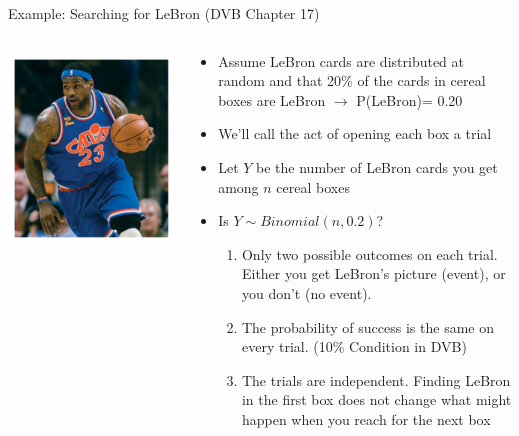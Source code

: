 \documentclass[10pt]{beamer}\usepackage[]{graphicx}\usepackage[]{color}
\begin{document}
\begin{frame}{Example: Searching for LeBron (DVB Chapter 17)}
	\begin{columns}
		\begin{column}{0.2\textwidth}
			\includegraphics[scale=0.2]{lebron.png}
		\end{column}
		\begin{column}{0.78\textwidth}
			\small
			\begin{itemize}
				\item Assume LeBron cards are distributed at random and
				that 20\% of the cards in cereal boxes are LeBron $\to$ P(LeBron)= 0.20
				\item We'll call the act of opening each box a trial
				\item Let $Y$ be the number of LeBron cards you get among $n$ cereal boxes
				\item Is $Y\sim Binomial(n,0.2)$? \pause
				\begin{enumerate}
					\item Only two possible outcomes on each trial. Either you get LeBron's picture (event), or you don't (no event).
					\item The probability of success is the same on every trial. (10\% Condition in DVB)
					\item The trials are independent. Finding LeBron in the first box does not change what might happen when you reach for the next box
				\end{enumerate}
			\end{itemize}
		\end{column}
	\end{columns}
	
\end{frame}
\end{document}
